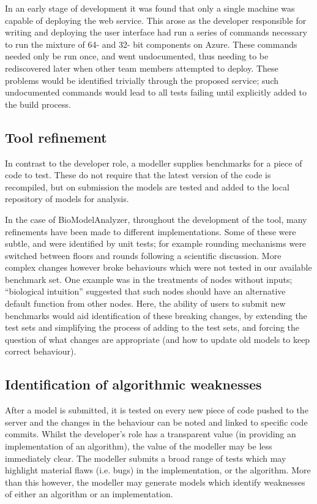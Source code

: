 \documentclass[conference]{IEEEtran}
\begin{document}
In an early stage of development it was found that only a single
machine was capable of deploying the web service. This arose as the
developer responsible for writing and deploying the user interface had
run a series of commands necessary to run the mixture of 64- and 32-
bit components on Azure. These commands needed only be run once, and
went undocumented, thus needing to be rediscovered later when other
team members attempted to deploy.  These problems would be identified
trivially through the proposed service; such undocumented commands
would lead to all tests failing until explicitly added to the build
process.

\subsection{Tool refinement}

In contrast to the developer role, a modeller supplies benchmarks for
a piece of code to test. These do not require that the latest version
of the code is recompiled, but on submission the models are tested and
added to the local repository of models for analysis.

In the case of BioModelAnalyzer, throughout the development of the
tool, many refinements have been made to different
implementations. Some of these were subtle, and were identified by
unit tests; for example rounding mechanisms were switched between
floors and rounds following a scientific discussion. More complex
changes however broke behaviours which were not tested in our
available benchmark set. One example was in the treatments of nodes
without inputs; ``biological intuition'' suggested that such nodes
should have an alternative default function from other nodes. Here,
the ability of users to submit new benchmarks would aid identification
of these breaking changes, by extending the test sets and simplifying
the process of adding to the test sets, and forcing the question of
what changes are appropriate (and how to update old models to keep
correct behaviour).


\subsection{Identification of algorithmic weaknesses}

After a model is submitted, it is tested on every new piece of code
pushed to the server and the changes in the behaviour can be noted and
linked to specific code commits. Whilst the developer's role has a
transparent value (in providing an implementation of an algorithm),
the value of the modeller may be less immediately clear. The modeller
submits a broad range of tests which may highlight material flaws
(i.e. bugs) in the implementation, or the algorithm. More than this
however, the modeller may generate models which identify weaknesses of
either an algorithm or an implementation.
\end{document}
